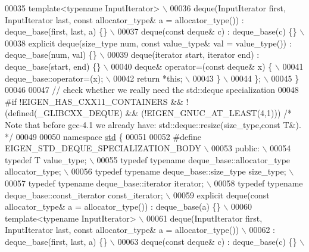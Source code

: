 \begin{DoxyCode}
00035 \textcolor{preprocessor}{    template<typename InputIterator> \(\backslash\)}
00036 \textcolor{preprocessor}{    deque(InputIterator first, InputIterator last, const allocator\_type& a = allocator\_type()) :
       deque\_base(first, last, a) \{\} \(\backslash\)}
00037 \textcolor{preprocessor}{    deque(const deque& c) : deque\_base(c) \{\}  \(\backslash\)}
00038 \textcolor{preprocessor}{    explicit deque(size\_type num, const value\_type& val = value\_type()) : deque\_base(num, val) \{\} \(\backslash\)}
00039 \textcolor{preprocessor}{    deque(iterator start, iterator end) : deque\_base(start, end) \{\}  \(\backslash\)}
00040 \textcolor{preprocessor}{    deque& operator=(const deque& x) \{  \(\backslash\)}
00041 \textcolor{preprocessor}{      deque\_base::operator=(x);  \(\backslash\)}
00042 \textcolor{preprocessor}{      return *this;  \(\backslash\)}
00043 \textcolor{preprocessor}{    \} \(\backslash\)}
00044 \textcolor{preprocessor}{  \}; \(\backslash\)}
00045 \textcolor{preprocessor}{\}}
00046 
00047 \textcolor{comment}{// check whether we really need the std::deque specialization}
00048 \textcolor{preprocessor}{#if !EIGEN\_HAS\_CXX11\_CONTAINERS && !(defined(\_GLIBCXX\_DEQUE) && (!EIGEN\_GNUC\_AT\_LEAST(4,1))) }\textcolor{comment}{/* Note that
       before gcc-4.1 we already have: std::deque::resize(size\_type,const T&). */}\textcolor{preprocessor}{}
00049 
00050 \textcolor{keyword}{namespace }\hyperlink{namespacestd}{std} \{
00051 
00052 \textcolor{preprocessor}{#define EIGEN\_STD\_DEQUE\_SPECIALIZATION\_BODY \(\backslash\)}
00053 \textcolor{preprocessor}{  public:  \(\backslash\)}
00054 \textcolor{preprocessor}{    typedef T value\_type; \(\backslash\)}
00055 \textcolor{preprocessor}{    typedef typename deque\_base::allocator\_type allocator\_type; \(\backslash\)}
00056 \textcolor{preprocessor}{    typedef typename deque\_base::size\_type size\_type;  \(\backslash\)}
00057 \textcolor{preprocessor}{    typedef typename deque\_base::iterator iterator;  \(\backslash\)}
00058 \textcolor{preprocessor}{    typedef typename deque\_base::const\_iterator const\_iterator;  \(\backslash\)}
00059 \textcolor{preprocessor}{    explicit deque(const allocator\_type& a = allocator\_type()) : deque\_base(a) \{\}  \(\backslash\)}
00060 \textcolor{preprocessor}{    template<typename InputIterator> \(\backslash\)}
00061 \textcolor{preprocessor}{    deque(InputIterator first, InputIterator last, const allocator\_type& a = allocator\_type()) \(\backslash\)}
00062 \textcolor{preprocessor}{    : deque\_base(first, last, a) \{\} \(\backslash\)}
00063 \textcolor{preprocessor}{    deque(const deque& c) : deque\_base(c) \{\}  \(\backslash\)}

\end{DoxyCode}
